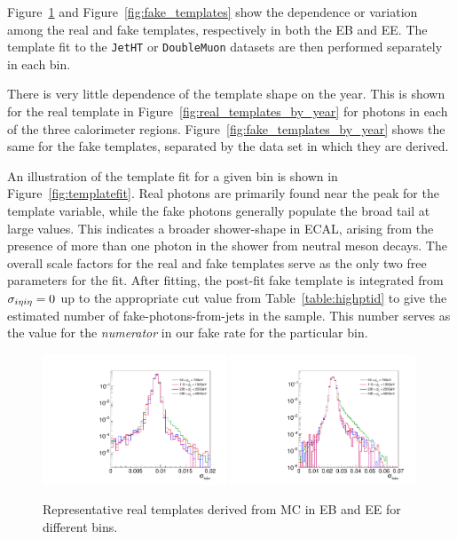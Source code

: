 Figure~\ref{fig:real_templates} and Figure~\ref{fig:fake_templates} show the \pt dependence or variation among the real and fake templates, respectively in both the EB and EE. The template fit to the \texttt{JetHT} or \texttt{DoubleMuon} datasets are then performed separately in each \pt bin.

There is very little dependence of the template shape on the year. This is shown for the real template in Figure~\ref{fig:real_templates_by_year} for photons in each of the three calorimeter regions. Figure~\ref{fig:fake_templates_by_year} shows the same for the fake templates, separated by the data set in which they are derived. 

An illustration of the template fit for a given \pt bin is shown in Figure~\ref{fig:templatefit}. Real photons are primarily found near the peak for the \sieie template variable, while the fake photons generally populate the broad tail at large \sieie values. This indicates a broader shower-shape in ECAL, arising from the presence of more than one photon in the shower from neutral meson decays. The overall scale factors for the real and fake templates serve as the only two free parameters for the fit. After fitting, the post-fit fake template is integrated from $\sigma_{i\eta i\eta}=0$ up to the appropriate cut value from Table~\ref{table:highptid} to give the estimated number of fake-photons-from-jets in the sample. This number serves as the value for the \emph{numerator} in our fake rate for the particular \pt bin. 

\begin{figure}[!htbp]
\caption{Representative real templates derived from MC in EB and EE for different \pt bins.}
\centering
\includegraphics[width=0.49\textwidth]{fig/realtemplatecompEB_2018.pdf}
\includegraphics[width=0.49\textwidth]{fig/realtemplatecompEE_2018.pdf}
\label{fig:real_templates}
\end{figure}

